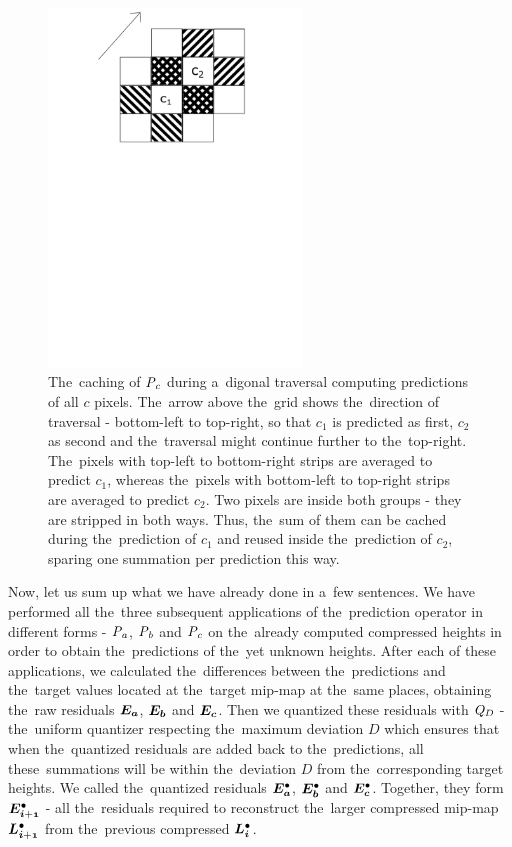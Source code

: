 \begin{figure}
	\includegraphics[trim={0 18cm 1cm 0cm}, clip, width=0.6\textwidth]{figures/ccaching.pdf}\centering
	\caption{The~caching of $\mathit{P_{c}}$ during a~digonal traversal computing predictions of all $c$ pixels. The~arrow above the~grid shows the~direction of traversal - bottom-left to top-right, so that $c_1$ is predicted as first, $c_2$ as second and the~traversal might continue further to the~top-right. The~pixels with top-left to bottom-right strips are averaged to predict $c_1$, whereas the~pixels with bottom-left to top-right strips are averaged to predict $c_2$. Two pixels are inside both groups - they are stripped in both ways. Thus, the~sum of them can be cached during the~prediction of $c_1$ and reused inside the~prediction of $c_2$, sparing one summation per prediction this way.}
	\label{fig:ccaching}
\end{figure}

Now, let us sum up what we have already done in a~few sentences. We have performed all the~three subsequent applications of the~prediction operator in different forms - $\mathit{P_{a}}$, $\mathit{P_{b}}$ and $\mathit{P_{c}}$ on the~already computed compressed heights in order to obtain the~predictions of the~yet unknown heights. After each of these applications, we calculated the~differences between the~predictions and the~target values located at the~target mip-map at the~same places, obtaining the~raw residuals $\objnorm{E}{a}$, $\objnorm{E}{b}$ and $\objnorm{E}{c}$. Then we quantized these residuals with $\mathit{Q_{D}}$ - the~uniform quantizer respecting the~maximum deviation $D$ which ensures that when the~quantized residuals are added back to the~predictions, all these~summations will be within the~deviation $D$ from the~corresponding target heights. We called the~quantized residuals $\objdot{E}{a}$, $\objdot{E}{b}$ and $\objdot{E}{c}$. Together, they form $\objdot{E}{i+1}$ - all the~residuals required to reconstruct the~larger compressed mip-map $\ldot{i+1}$ from the~previous compressed $\ldot{i}$.

